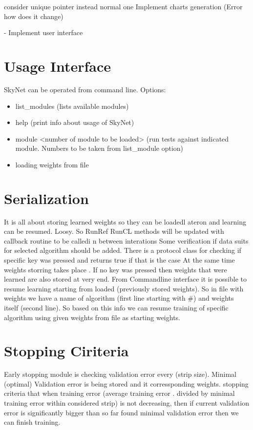 \documentclass[a4paper,10pt]{article}
\begin{document}
consider unique pointer instead normal one
Implement charts generation (Error how does it change) 

- Implement user interface 
\section{Usage Interface}
SkyNet can be operated from command line. Options:
\begin{itemize}
\item list\_modules (lists available modules)
\item help (print info about usage of SkyNet)
\item module <number of module to be loaded> (run tests against indicated module. Numbers to be taken from list\_module option)
\item loading weights from file
\end{itemize}

\section{Serialization}
It is all about storing learned weights so they can be loadedl ateron and learning can be resumed.
Loosy. So RunRef RunCL methods will be updated with callback routine to be calledi n between interations
Some verification if data suits for selected algorithm should be added. 
There is a protocol class for checking if specific key was pressed and returns true if that is the case
At the same time weights storring takes place . If no key was pressed then weights that were learned are also stored at very end.
From Commandline interface it is possible to resume learning starting from loaded (previously stored weights).
So in file with weights we have a name of algorithm (first line starting with \#) and weights itself (second line). So
based on this info we can resume training of specific algorithm using given weights from file as starting weights.

\section{Stopping Ciriteria}
Early stopping module is checking validation error every (strip size). Minimal (optimal) Validation error is being
stored and it corressponding weights. stopping criteria that when training error (average training error . divided by minimal training error
within considered strip) is not decreasing, then if current validation error is significantly bigger than so far found minimal validation error then
we can finish training.
\end{document}
